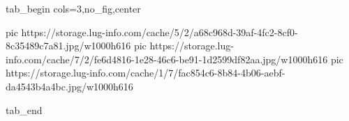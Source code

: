  
 
 
 
 


\ifcmt
  tab_begin cols=3,no_fig,center

     pic https://storage.lug-info.com/cache/5/2/a68c968d-39af-4fc2-8cf0-8c35489c7a81.jpg/w1000h616%
		 pic https://storage.lug-info.com/cache/7/2/fe6d4816-1e28-46c6-be91-1d2599df82aa.jpg/w1000h616%
		 pic https://storage.lug-info.com/cache/1/7/fac854c6-8b84-4b06-aebf-da4543b4a4bc.jpg/w1000h616%

  tab_end
\fi
